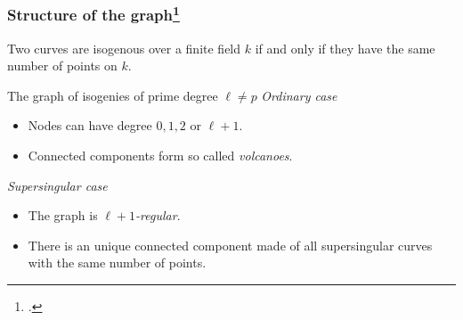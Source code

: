 \documentclass{beamer}
\begin{document}

\begin{frame}
  \frametitle{Structure of the graph\footcite{kohel,fouquet+morain02}}

  \begin{theorem}
    Two curves are isogenous over a finite field $k$ if and only if
    they have the \alert{same number of points} on $k$.
  \end{theorem}

  \begin{block}{The graph of isogenies of \alert{prime} degree \alert{$\ell\ne p$}}
    \emph{Ordinary case}
    \begin{itemize}
    \item Nodes can have degree \emph{$0,1,2$} or \emph{$\ell+1$}.
    \item Connected components form so called \emph{volcanoes}.
    \end{itemize}
    
    \emph{Supersingular case}
    \begin{itemize}
    \item The graph is \emph{$\ell+1$-regular}.
    \item There is an \alert{unique connected component} made of all
      supersingular curves with the same number of points.
    \end{itemize}
  \end{block}
\end{frame}

\end{document}
